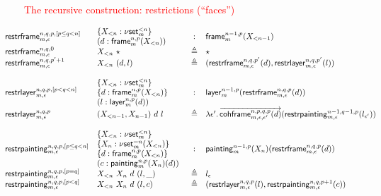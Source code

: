 \documentclass[12pt,landscape]{article}
\newcommand{\defeq}{\triangleq}
\newcommand{\partialcubset}[2]{\mathsf{\nu set}_{#1}^{<#2}}
\newcommand{\mycubsetcomp}[2]{\mathsf{\nu set}_{#1}^{=#2}}
\newcommand{\mybox}[1]{\mathsf{frame}_{#1}}
\newcommand{\mylayer}[1]{\mathsf{layer}_{#1}}
\newcommand{\mycube}[1]{\mathsf{painting}_{#1}}
\newcommand{\unitpoint}{\star}
\newcommand{\downbox}[2]{\mathsf{restrframe}_{#1,#2}}
\newcommand{\downlayer}[2]{\mathsf{restrlayer}_{#1,#2}}
\newcommand{\downcube}[2]{\mathsf{restrpainting}_{#1,#2}}
\newcommand{\cohbox}[2]{\mathsf{cohframe}_{#1,#2}}
\begin{document}
\begin{LARGE}
\begin{sf}
\newpage

\begin{center}
\textcolor{red}{\huge The recursive construction: restrictions (``faces'')}
\end{center}

\begin{large}
$$\hspace{-1cm}
\begin{array}{llcl}
\downbox{m}{\epsilon}^{n,q,p,[p \leq q < n]} & \!\!\!\begin{array}{l}\{X_{<n}:\partialcubset{m}{n}\}\\(d:\mybox{m}^{n,p}(X_{<n}))\end{array}& : & \mybox{m}^{n-1,p}(X_{<n-1})\\
\downbox{m}{\epsilon}^{n,q,0} & X_{<n}~\unitpoint & \defeq & \unitpoint\\
\downbox{m}{\epsilon}^{n,q,p'+1} & X_{<n}~(d,l) & \defeq & (\downbox{m}{\epsilon}^{n,q,p'}(d),\downlayer{m}{\epsilon}^{n,q,p'}(l))\\
\\
\downlayer{m}{\epsilon}^{n,q,p,[p < q < n]} & \!\!\!\begin{array}{l}\{X_{<n}:\partialcubset{m}{n}\}\\\{d:\mybox{m}^{n,p}(X_{<n})\}\\(l:\mylayer{m}^{n,p}(d))\end{array}& : & \mylayer{m}^{n-1,p}(\downbox{m}{\epsilon}^{n,q,p}(d))\\
\downlayer{m}{\epsilon}^{n,q,p} & (X_{<n-1},X_{n-1})~d~l & \defeq & \lambda\epsilon'.\,\overrightarrow{\cohbox{m}{\epsilon,\epsilon'}^{n,p,q,p}(d)}(\downcube{m}{\epsilon}^{n-1,q-1,p}(l_{\epsilon'}))\\
\\
\downcube{m}{\epsilon}^{n,q,p,[p \leq q < n]} & \!\!\!\begin{array}{l}\{X_{<n}:\partialcubset{m}{n}\}\\\{X_n:\mycubsetcomp{m}{n}(X_{<n})\}\\\{d:\mybox{m}^{n,p}(X_{<n})\}\\(c:\mycube{m}^{n,p}(X_n)(d))\end{array}& : & \mycube{m}^{n-1,p}(X_{n})(\downbox{m}{\epsilon}^{n,q,p}(d))\\
\downcube{m}{\epsilon}^{n,q,p,[p=q]} & X_{<n}~X_n~d~(l,\_) & \defeq & l_{\epsilon}\\
\downcube{m}{\epsilon}^{n,q,p,[p<q]} & X_{<n}~X_n~d~(l,c) & \defeq & (\downlayer{m}{\epsilon}^{n,q,p}(l),\downcube{m}{\epsilon}^{n,q,p+1}(c))\\
\\
\end{array}
$$
\end{large}


\end{sf}
\end{LARGE}
\end{document}

